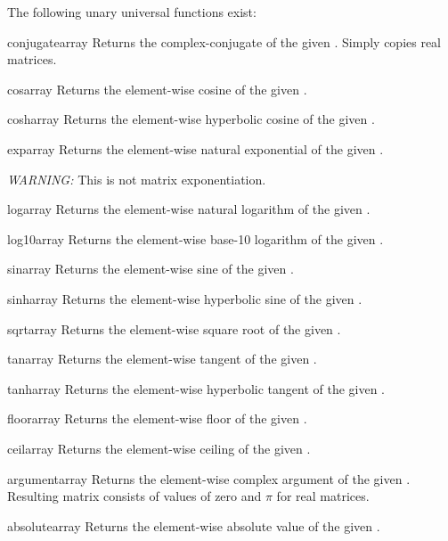 The following unary universal functions exist:

\begin{funcdesc}{conjugate}{array}
  Returns the complex-conjugate of the given . Simply
  copies real matrices.
\end{funcdesc}
\begin{funcdesc}{cos}{array}
  Returns the element-wise cosine of the given .
\end{funcdesc}
\begin{funcdesc}{cosh}{array}
  Returns the element-wise hyperbolic cosine of the given
  .
\end{funcdesc}
\begin{funcdesc}{exp}{array}
  Returns the element-wise natural exponential of the given
  . 

  \emph{WARNING:} This is not matrix exponentiation.
\end{funcdesc}
\begin{funcdesc}{log}{array}
  Returns the element-wise natural logarithm of the given
  .
\end{funcdesc}
\begin{funcdesc}{log10}{array}
  Returns the element-wise base-10 logarithm of the given
  .
\end{funcdesc}
\begin{funcdesc}{sin}{array}
  Returns the element-wise sine of the given .
\end{funcdesc}
\begin{funcdesc}{sinh}{array}
  Returns the element-wise hyperbolic sine of the given .
\end{funcdesc}
\begin{funcdesc}{sqrt}{array}
  Returns the element-wise square root of the given .
\end{funcdesc}
\begin{funcdesc}{tan}{array}
  Returns the element-wise tangent of the given .
\end{funcdesc}
\begin{funcdesc}{tanh}{array}
  Returns the element-wise hyperbolic tangent of the given .
\end{funcdesc}
\begin{funcdesc}{floor}{array}
  Returns the element-wise floor of the given .
\end{funcdesc}
\begin{funcdesc}{ceil}{array}
  Returns the element-wise ceiling of the given .
\end{funcdesc}
\begin{funcdesc}{argument}{array}
  Returns the element-wise complex argument of the given .
  Resulting matrix consists of values of zero and $\pi$ for real matrices.
\end{funcdesc}
\begin{funcdesc}{absolute}{array}
  Returns the element-wise absolute value of the given .
\end{funcdesc}

